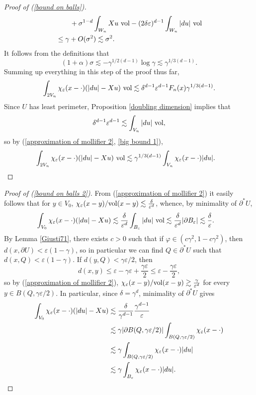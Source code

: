 \begin{proof}[Proof of (\ref{bound on balls})]
\begin{align*}
&\qquad + \sigma^{1 - d} \int_{W_n} Xu ~\mathrm{vol} - (2\delta\varepsilon)^{d - 1} \int_{W_n} |du| ~\mathrm{vol} \\
&\leq \gamma + O(\sigma^2) \lesssim \sigma^2.
\end{align*}
It follows from the definitions that
$$(1 + \alpha)\sigma \lesssim -\gamma^{1/2(d - 1)} \log \gamma \lesssim \gamma^{1/3(d - 1)}.$$
Summing up everything in this step of the proof thus far,
\begin{equation}\label{big bound 1}
\int_{2V_n} \chi_\varepsilon(x - \cdot)(|du| - Xu) ~\mathrm{vol} \lesssim \delta^{d - 1} \varepsilon^{d - 1} F_n(x) \gamma^{1/3(d - 1)}.
\end{equation}
Since $U$ has least perimeter, Proposition \ref{doubling dimension} implies that
$$\delta^{d - 1} \varepsilon^{d - 1} \lesssim \int_{V_n} |du| ~\mathrm{vol},$$
so by (\ref{approximation of mollifier 2}, \ref{big bound 1}),
\begin{align*}
\int_{2V_n} \chi_\varepsilon(x - \cdot)(|du| - Xu) ~\mathrm{vol}
&\lesssim \gamma^{1/3(d - 1)} \int_{V_n} \chi_\varepsilon(x - \cdot)|du|.
\qedhere \end{align*}
\end{proof}

\begin{proof}[Proof of (\ref{bound on balls 2})]
From (\ref{approximation of mollifier 2}) it easily follows that for $y \in V_0$, $\chi_\varepsilon(x - y)/\mathrm{vol}(x - y) \lesssim \frac{\delta}{\varepsilon^d}$,
whence, by minimality of $\partial^* U$,
\begin{align*}
\int_{V_0} \chi_\varepsilon(x - \cdot)(|du| - Xu) &\lesssim \frac{\delta}{\varepsilon^d} \int_{B_\varepsilon} |du| ~\mathrm{vol} \lesssim \frac{\delta}{\varepsilon^d} |\partial B_\varepsilon| \lesssim \frac{\delta}{\varepsilon}.
\end{align*}
By Lemma \ref{Giusti71}, there exists $c > 0$ such that if $\varphi \in (c\gamma^2, 1 - c\gamma^2)$, then $d(x, \partial U) < \varepsilon(1 - \gamma)$, so in particular we can find $Q \in \partial^* U$ such that $d(x, Q) < \varepsilon(1 - \gamma)$.
If $d(y, Q) < \gamma\varepsilon/2$, then
$$d(x, y) \leq \varepsilon - \gamma\varepsilon + \frac{\gamma\varepsilon}{2} \leq \varepsilon - \frac{\gamma\varepsilon}{2},$$
so by (\ref{approximation of mollifier 2}), $\chi_\varepsilon(x - y)/\mathrm{vol}(x - y) \gtrsim \frac{\gamma}{\varepsilon^d}$
for every $y \in B(Q, \gamma\varepsilon/2)$.
In particular, since $\delta = \gamma^d$, minimality of $\partial^* U$ gives
\begin{align*}
\int_{V_0} \chi_\varepsilon(x - \cdot)(|du| - Xu) &\lesssim \frac{\delta}{\gamma^{d - 1}} \frac{\gamma^{d - 1}}{\varepsilon}\\
&\lesssim \gamma |\partial B(Q, \gamma\varepsilon/2)| \int_{B(Q, \gamma\varepsilon/2)} \chi_\varepsilon(x - \cdot) \\
&\lesssim \gamma \int_{B(Q, \gamma\varepsilon/2)} \chi_\varepsilon(x - \cdot) |du|\\
&\lesssim \gamma \int_{B_\varepsilon} \chi_\varepsilon(x - \cdot) |du|. \qedhere
\end{align*}
\end{proof}

